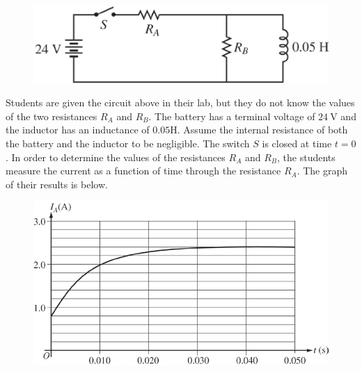 %
\begin{figure}[H]
\centering
\includegraphics[scale=0.5]{images/img-012-032.png}
\end{figure}


\question
Students are given the circuit above in their lab, but they do not know the values of the two resistances $R_{A}$ and $R_{B}$. The battery has a terminal voltage of $24 \mathrm{~V}$ and the inductor has an inductance of $0.05 \mathrm{H}$. Assume the internal resistance of both the battery and the inductor to be negligible. The switch $S$ is closed at time $t=0$. In order to determine the values of the resistances $R_{A}$ and $R_{B}$, the students measure the current as a function of time through the resistance $R_{A}$. The graph of their results is below. %

\begin{figure}[H]
\centering
\includegraphics[scale=0.5]{images/img-012-033.png}
\end{figure}


